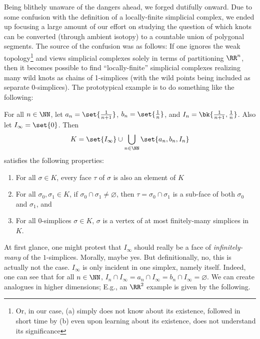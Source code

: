 Being blithely unaware of the dangers ahead, we forged dutifully
onward. Due to some confusion with the definition of a locally-finite
simplicial complex, we ended up focusing a large amount of our effort
on studying the question of which knots can be converted (through
ambient isotopy) to a countable union of polygonal segments. The
source of the confusion was as follows: If one ignores the weak
topology\footnote{Or, in our case, (a) simply does not know about its
  existence, followed in short time by (b) even upon learning about
  its existence, does not understand its significance} and views
simplicial complexes solely in terms of partitioning $\RR^n$, then it
becomes possible to find ``locally-finite'' simplicial complexes
realizing many wild knots as chains of 1-simplices (with the wild
points being included as separate $0$-simplices). The prototypical
example is to do something like the following:
\begin{leftbar}
  For all $n \in \NN$, let $a_n = \set{\frac{1}{n+1}}$, $b_n =
  \set{\frac{1}{n}}$, and $I_n = \bk{\frac{1}{n+1}, \frac{1}{n}}$.
  Also let $I_\infty = \set{0}$. Then
  \[
    K = \set{I_\infty} \cup \bigcup_{n \in \NN} \set{a_n, b_n, I_n}
  \]
  satisfies the following properties:
  \begin{enumerate}
    \item For all $\sigma \in K$, every face $\tau$ of $\sigma$ is
      also an element of $K$
    \item For all $\sigma_0, \sigma_1 \in K$, if $\sigma_0 \cap
      \sigma_1 \neq \varnothing$, then $\tau = \sigma_0 \cap \sigma_1$
      is a sub-face of both $\sigma_0$ and $\sigma_1$, and
    \item For all $0$-simplices $\sigma \in K$, $\sigma$ is a vertex
      of at most finitely-many simplices in $K$.
  \end{enumerate}
\end{leftbar}
At first glance, one might protest that $I_\infty$ should really be a
face of \emph{infinitely-many} of the $1$-simplices. Morally, maybe
yes. But definitionally, no, this is actually not the case. $I_\infty$
is only incident in one simplex, namely itself. Indeed, one can see
that for all $n \in \NN$, $I_n \cap I_\infty = a_n \cap I_\infty = b_n
\cap I_\infty = \varnothing$. We can create analogues in higher
dimensions; E.g., an $\RR^2$ example is given by the following.
